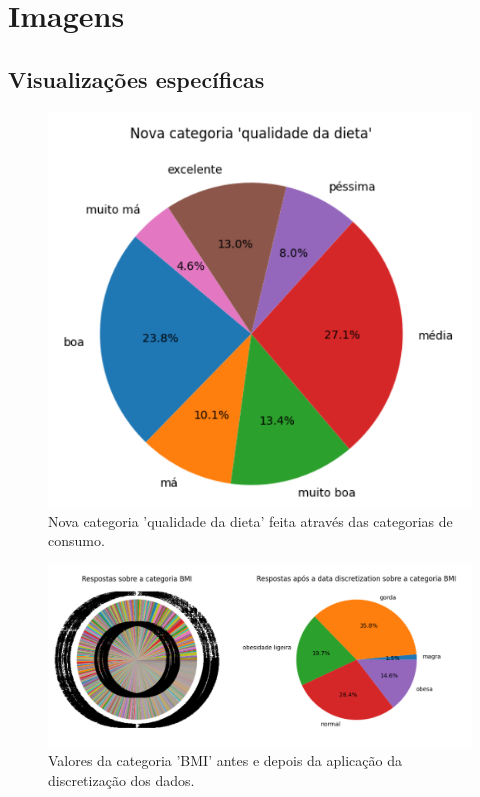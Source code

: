 \chapter{Imagens}
\label{chap:appendix}

\section{Visualizações específicas}

\begin{figure}[H]
    \centering
    \includegraphics[scale=0.5]{images/dieta.png}
    \caption{Nova categoria 'qualidade da dieta' feita através das categorias de consumo.}
    \label{fig:dieta}
\end{figure}

\begin{figure}[H]
    \centering
    \includegraphics[scale=0.45]{images/BMI.png}
    \caption{Valores da categoria 'BMI' antes e depois da aplicação da discretização dos dados.}
    \label{fig:bmi}
\end{figure}

